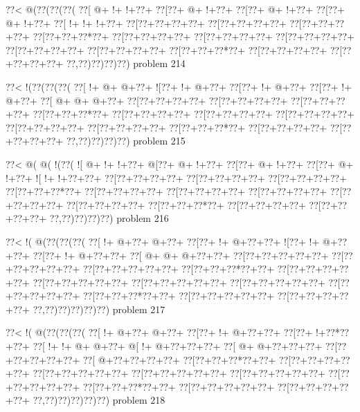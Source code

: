 \vbox{\vbox{\goo
\0??<\- @(\0??(\0??(\0??(
\0??[\- @+\- !+\- !+\0??+
\0??[\0??+\- @+\- !+\0??+
\0??[\0??+\- @+\- !+\0??+
\0??[\0??+\- @+\- !+\0??+
\0??[\- !+\- !+\- !+\0??+
\0??[\0??+\0??+\0??+\0??+
\0??[\0??+\0??+\0??+\0??+
\0??[\0??+\0??+\0??+\0??+
\0??[\0??+\0??+\0??*\0??+
\0??[\0??+\0??+\0??+\0??+
\0??[\0??+\0??+\0??+\0??+
\0??[\0??+\0??+\0??+\0??+
\0??[\0??+\0??+\0??+\0??+
\0??[\0??+\0??+\0??+\0??+
\0??[\0??+\0??+\0??*\0??+
\0??[\0??+\0??+\0??+\0??+
\0??[\0??+\0??+\0??+\0??+
\0??,\0??)\0??)\0??)\0??)
}
\hfil problem 214\hfil\break
}

\vbox{\vbox{\goo
\0??<\- !(\0??(\0??(\0??(
\0??[\- !+\- @+\- @+\0??+
\- ![\0??+\- !+\- @+\0??+
\0??[\0??+\- !+\- @+\0??+
\0??[\0??+\- !+\- @+\0??+
\0??[\- @+\- @+\- @+\0??+
\0??[\0??+\0??+\0??+\0??+
\0??[\0??+\0??+\0??+\0??+
\0??[\0??+\0??+\0??+\0??+
\0??[\0??+\0??+\0??*\0??+
\0??[\0??+\0??+\0??+\0??+
\0??[\0??+\0??+\0??+\0??+
\0??[\0??+\0??+\0??+\0??+
\0??[\0??+\0??+\0??+\0??+
\0??[\0??+\0??+\0??+\0??+
\0??[\0??+\0??+\0??*\0??+
\0??[\0??+\0??+\0??+\0??+
\0??[\0??+\0??+\0??+\0??+
\0??,\0??)\0??)\0??)\0??)
}
\hfil problem 215\hfil\break
}

\vbox{\vbox{\goo
\0??<\- @(\- @(\- !(\0??(
\- ![\- @+\- !+\- !+\0??+
\- @[\0??+\- @+\- !+\0??+
\0??[\0??+\- @+\- !+\0??+
\0??[\0??+\- @+\- !+\0??+
\- ![\- !+\- !+\0??+\0??+
\0??[\0??+\0??+\0??+\0??+
\0??[\0??+\0??+\0??+\0??+
\0??[\0??+\0??+\0??+\0??+
\0??[\0??+\0??+\0??*\0??+
\0??[\0??+\0??+\0??+\0??+
\0??[\0??+\0??+\0??+\0??+
\0??[\0??+\0??+\0??+\0??+
\0??[\0??+\0??+\0??+\0??+
\0??[\0??+\0??+\0??+\0??+
\0??[\0??+\0??+\0??*\0??+
\0??[\0??+\0??+\0??+\0??+
\0??[\0??+\0??+\0??+\0??+
\0??,\0??)\0??)\0??)\0??)
}
\hfil problem 216\hfil\break
}

\vbox{\vbox{\goo
\0??<\- !(\- @(\0??(\0??(\0??(
\0??[\- !+\- @+\0??+\- @+\0??+
\0??[\0??+\- !+\- @+\0??+\0??+
\- ![\0??+\- !+\- @+\0??+\0??+
\0??[\0??+\- !+\- @+\0??+\0??+
\0??[\- @+\- @+\- @+\0??+\0??+
\0??[\0??+\0??+\0??+\0??+\0??+
\0??[\0??+\0??+\0??+\0??+\0??+
\0??[\0??+\0??+\0??+\0??+\0??+
\0??[\0??+\0??+\0??*\0??+\0??+
\0??[\0??+\0??+\0??+\0??+\0??+
\0??[\0??+\0??+\0??+\0??+\0??+
\0??[\0??+\0??+\0??+\0??+\0??+
\0??[\0??+\0??+\0??+\0??+\0??+
\0??[\0??+\0??+\0??+\0??+\0??+
\0??[\0??+\0??+\0??*\0??+\0??+
\0??[\0??+\0??+\0??+\0??+\0??+
\0??[\0??+\0??+\0??+\0??+\0??+
\0??,\0??)\0??)\0??)\0??)\0??)
}
\hfil problem 217\hfil\break
}

\vbox{\vbox{\goo
\0??<\- !(\- @(\0??(\0??(\0??(
\0??[\- !+\- @+\0??+\- @+\0??+
\0??[\0??+\- !+\- @+\0??+\0??+
\0??[\0??+\- !+\0??*\0??+\0??+
\0??[\- !+\- !+\- @+\- @+\0??+
\- @[\- !+\- @+\0??+\0??+\0??+
\0??[\- @+\- @+\0??+\0??+\0??+
\0??[\0??+\0??+\0??+\0??+\0??+
\0??[\- @+\0??+\0??+\0??+\0??+
\0??[\0??+\0??+\0??*\0??+\0??+
\0??[\0??+\0??+\0??+\0??+\0??+
\0??[\0??+\0??+\0??+\0??+\0??+
\0??[\0??+\0??+\0??+\0??+\0??+
\0??[\0??+\0??+\0??+\0??+\0??+
\0??[\0??+\0??+\0??+\0??+\0??+
\0??[\0??+\0??+\0??*\0??+\0??+
\0??[\0??+\0??+\0??+\0??+\0??+
\0??[\0??+\0??+\0??+\0??+\0??+
\0??,\0??)\0??)\0??)\0??)\0??)
}
\hfil problem 218\hfil\break
}

